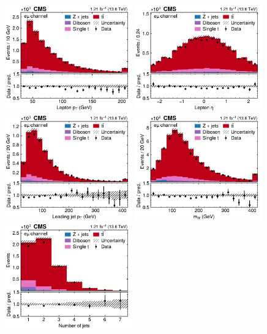 \begin{figure}[!hp]
\centering
\includegraphics[width=0.49\textwidth]{figures/ttxs/lep_pt_em.pdf}
\hfill
\includegraphics[width=0.49\textwidth]{figures/ttxs/lep_eta_em.pdf}
\includegraphics[width=0.49\textwidth]{figures/ttxs/1st_jet_pt_em.pdf}
\hfill
\includegraphics[width=0.49\textwidth]{figures/ttxs/mll_em.pdf}
\includegraphics[width=0.49\textwidth]{figures/ttxs/njet_em.pdf}

\end{figure}
